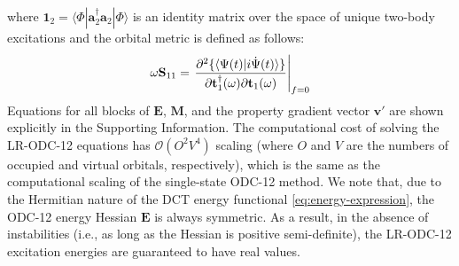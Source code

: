 where
\(
    \mathbf{1}_2
    =
    \langle\Phi|\mathbf{a}_2^\dagger \mathbf{a}_2|\Phi\rangle
\)
is an identity matrix over the space of unique two-body excitations and the
orbital metric is defined as follows:
\begin{equation}
    \label{eq:metric-blocks}
    \omega\mathbf{S}_{11}
    =
    \left.
        \frac{\partial^2 \{\langle\Psi(t)|i\dot\Psi(t)\rangle\}}{%
            \partial \mathbf{t}_1^\dagger(\omega)
            \partial \mathbf{t}_1(\omega)
        }
    \right|_{f=0}
\end{equation}
Equations for all blocks of $\mathbf{E}$, $\mathbf{M}$, and the property
gradient vector $\mathbf{v}'$ are shown explicitly in the Supporting
Information. The computational cost of solving the LR-ODC-12 equations has $\mathcal{O}(O^2V^4)$ scaling (where $O$ and $V$ are the numbers of occupied and virtual orbitals, respectively), which is the same as the computational scaling of the single-state ODC-12 method.
We note that, due to the Hermitian nature of the DCT energy functional
\eqref{eq:energy-expression}, the ODC-12 energy Hessian $\mathbf{E}$ is always
symmetric.
As a result, in the absence of instabilities (i.e., as long as the Hessian is
positive semi-definite), the LR-ODC-12 excitation energies are guaranteed to
have real values. 


